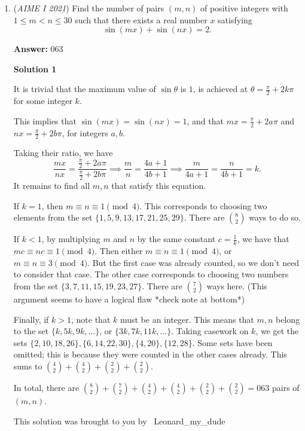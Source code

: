 \begin{enumerate}
	\item (\textit{AIME I 2021}) Find the number of pairs $(m,n)$ of positive integers with $1\le m<n\le 30$ such that there exists a real number $x$ satisfying
 \[\sin(mx)+\sin(nx)=2.\]

 \textbf{Answer: }063



\textbf{Solution 1}

It is trivial that the maximum value of $\sin \theta$ is $1$, is achieved at $\theta = \frac{\pi}{2}+2k\pi$ for some integer $k$.

 This implies that $\sin(mx) = \sin(nx) = 1$, and that $mx = \frac{\pi}{2}+2a\pi$ and $nx = \frac{\pi}{2}+2b\pi$, for integers $a, b$.

 Taking their ratio, we have 
 \[\frac{mx}{nx} = \frac{\frac{\pi}{2}+2a\pi}{\frac{\pi}{2}+2b\pi} \implies \frac{m}{n} = \frac{4a + 1}{4b + 1} \implies \frac{m}{4a + 1} = \frac{n}{4b + 1} = k.\]It remains to find all $m, n$ that satisfy this equation.

 If $k = 1$, then $m \equiv n \equiv 1 \pmod 4$. This corresponds to choosing two elements from the set $\{1, 5, 9, 13, 17, 21, 25, 29\}$. There are $\binom 82$ ways to do so.

 If $k < 1$, by multiplying $m$ and $n$ by the same constant $c = \frac{1}{k}$, we have that $mc \equiv nc \equiv 1 \pmod 4$. Then either $m \equiv n \equiv 1 \pmod 4$, or $m \equiv n \equiv 3 \pmod 4$. But the first case was already counted, so we don't need to consider that case. The other case corresponds to choosing two numbers from the set $\{3, 7, 11, 15, 19, 23, 27\}$. There are $\binom 72$ ways here. (This argument seems to have a logical flaw *check note at bottom*)

 Finally, if $k > 1$, note that $k$ must be an integer. This means that $m, n$ belong to the set $\{k, 5k, 9k, \dots\}$, or $\{3k, 7k, 11k, \dots\}$. Taking casework on $k$, we get the sets $\{2, 10, 18, 26\}, \{6, 14, 22, 30\}, \{4, 20\}, \{12, 28\}$. Some sets have been omitted; this is because they were counted in the other cases already. This sums to $\binom 42 + \binom 42 + \binom 22 + \binom 22$.

 In total, there are $\binom 82 + \binom 72 + \binom 42 + \binom 42 + \binom 22 + \binom 22 = \boxed{063}$ pairs of $(m, n)$.

 This solution was brought to you by ~Leonard\_my\_dude~

 



\end{enumerate}

